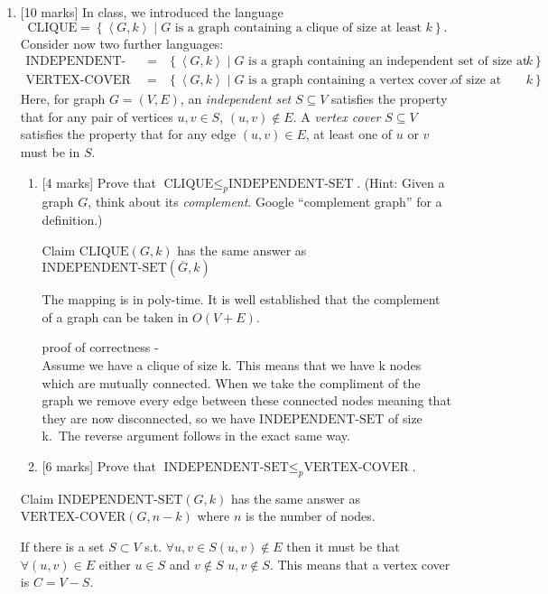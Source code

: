 \documentclass{article}
\newcommand{\class}[1]{\text{#1}}
\newcommand{\set}[1]{{\left\{#1\right\}}}    %
\newcommand{\enc}[1]{\left<#1\right>}
\begin{document}
\begin{enumerate}
    \item {[10 marks]} In class, we introduced the language
    \[
        \class{CLIQUE} = \set{\enc{G,k}\mid G\text{ is a graph containing a clique of size at least }k}.
    \]
    Consider now two further languages:
    \begin{eqnarray*}
        \class{INDEPENDENT-SET} &=& \set{\enc{G,k}\mid G\text{ is a graph containing an independent set of size at least }k}\\
        \class{VERTEX-COVER} &=& \set{\enc{G,k}\mid G\text{ is a graph containing a vertex cover of size at most }k}.
    \end{eqnarray*}
    Here, for graph $G=(V,E)$, an \emph{independent set} $S\subseteq V$ satisfies the property that for any pair of vertices $u,v\in S$, $(u,v)\not\in E$. A \emph{vertex cover} $S\subseteq V$ satisfies the property that for any edge $(u,v)\in E$, at least one of $u$ or $v$ must be in $S$.
    \begin{enumerate}
        \item {[4 marks]} Prove that $\class{CLIQUE}\leq_p\class{INDEPENDENT-SET}$. (Hint: Given a graph $G$, think about its \emph{complement}. Google ``complement graph'' for a definition.)

Claim $\class{CLIQUE}(G,k)$ has the same answer as $\class{INDEPENDENT-SET}(\overline{G}, k)$  

The mapping is in poly-time. It is well established that the complement of a graph can be taken in $O(V +E)$. 

proof of correctness - \\
Assume we have a clique of size k. This means that we have k nodes which are mutually connected. When we take the compliment of the graph we remove every edge between these connected nodes meaning that they are now disconnected, so we have $\class{INDEPENDENT-SET}$ of size k.\
The reverse argument follows in the exact same way.
        
        \item {[6 marks]} Prove that $\class{INDEPENDENT-SET}\leq_p\class{VERTEX-COVER}$.
    \end{enumerate}
    
Claim $\class{INDEPENDENT-SET}(G, k)$ has the same answer as $\class{VERTEX-COVER}(G, n-k)$ where $n$ is the number of nodes.

If there is a set $S \subset V$ s.t. $\forall u, v \in S (u,v) \notin E$ then it must be that $\forall (u, v) \in E$ either $u \in S$ and $v \notin S$ $u,v \notin S$. This means that a vertex cover is $C = V - S$.


\end{enumerate}
\end{document}
